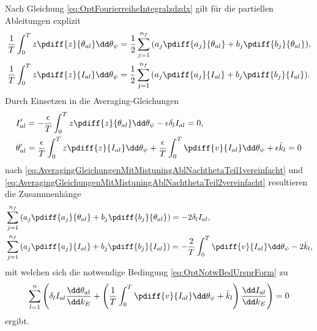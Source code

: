 %
Nach Gleichung	\eqref{eq:OptFourierreiheIntegralzdzdx} gilt für die partiellen Ableitungen explizit
%
\begin{align}
	& \frac{1}{T} \int_0^T{z \pdiff{z}{{\theta_{al}}} \dd \theta_{\psi}} = \frac{1}{2} \sum_{j=1}^{n_f}{\left(a_j \pdiff{a_j}{{\theta_{al}}} + b_j \pdiff{b_j}{{\theta_{al}}}\right)} %
	, \\
	& \frac{1}{T} \int_0^T{z \pdiff{z}{{I_{al}}} \dd \theta_{\psi}} = \frac{1}{2} \sum_{j=1}^{n_f}{\left(a_j \pdiff{a_j}{{I_{al}}} + b_j \pdiff{b_j}{{I_{al}}}\right)} %
	.
\end{align}
%
%
%
%
Durch Einsetzen in die Averaging-Gleichungen 
%
%
\begin{align}
	& I_{al}^\prime = -\frac{\epsilon}{T} \int_0^T{z \pdiff{z}{{\theta_{al}}} \dd \theta_{\psi}} - \epsilon \delta_l I_{al} = 0, \\ 
	& \theta_{al}^\prime = \frac{\epsilon}{T} \int_0^T{z \pdiff{z}{{I_{al}}} \dd \theta_{\psi}} + \frac{\epsilon}{T} \int_0^T{\pdiff{v}{{I_{al}}} \dd \theta_{\psi}} + \epsilon \bar{k}_l = 0 
\end{align}
nach \eqref{eq:AveragingGleichungenMitMistuningAblNachthetaTeil1vereinfacht}	 
und \eqref{eq:AveragingGleichungenMitMistuningAblNachthetaTeil2vereinfacht} resultieren die Zusammenhänge
%
%
%
%
\begin{align}
	& \sum_{j=1}^{n_f}{\left(a_j \pdiff{a_j}{{\theta_{al}}} + b_j \pdiff{b_j}{{\theta_{al}}}\right)} = %
	- 2 \delta_l I_{al}
	\label{eq:OptAverGlIalUmgeschrieben}, \\
	& \sum_{j=1}^{n_f}{\left(a_j \pdiff{a_j}{{I_{al}}} + b_j \pdiff{b_j}{{I_{al}}}\right)} = - \frac{2}{T} \int_0^T{\pdiff{v}{{I_{al}}} \dd \theta_{\psi}} - 2 \bar{k}_l
	\label{eq:OptAverGlThetaalUmgeschrieben},
\end{align}
%
%
%
%
mit welchen sich die notwendige Bedingung 	\eqref{eq:OptNotwBedUrsprForm}  zu
%
%
\begin{equation}
			\sum_{l=1}^{n} { \left(  \delta_l I_{al}  \frac{\dd \theta_{al}}{\dd k_E} 
		  + \left(  \frac{1}{T} \int_0^T{\pdiff{v}{{I_{al}}} \dd \theta_{\psi}} +  \bar{k}_l \right)  \frac{\dd I_{al}}{\dd k_E}    \right) } 	= 0
\end{equation}
ergibt.

